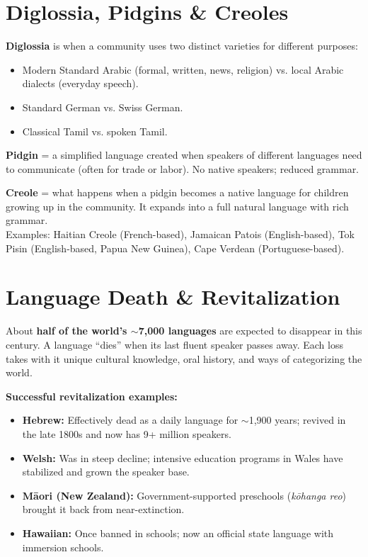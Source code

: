 \documentclass[11pt, letterpaper]{article}
\begin{document}
\section*{Diglossia, Pidgins \& Creoles}

\textbf{Diglossia} is when a community uses two distinct varieties for different purposes:
\begin{itemize}[noitemsep]
  \item Modern Standard Arabic (formal, written, news, religion) vs. local Arabic dialects (everyday speech).
  \item Standard German vs. Swiss German.
  \item Classical Tamil vs. spoken Tamil.
\end{itemize}

\textbf{Pidgin} = a simplified language created when speakers of different languages need to communicate (often for trade or labor). No native speakers; reduced grammar.

\textbf{Creole} = what happens when a pidgin becomes a native language for children growing up in the community. It expands into a full natural language with rich grammar.\\
Examples: Haitian Creole (French-based), Jamaican Patois (English-based), Tok Pisin (English-based, Papua New Guinea), Cape Verdean (Portuguese-based).

\section*{Language Death \& Revitalization}

About \textbf{half of the world's $\sim$7{,}000 languages} are expected to disappear in this century. A language ``dies'' when its last fluent speaker passes away. Each loss takes with it unique cultural knowledge, oral history, and ways of categorizing the world.

\textbf{Successful revitalization examples:}
\begin{itemize}[noitemsep]
  \item \textbf{Hebrew:} Effectively dead as a daily language for $\sim$1{,}900 years; revived in the late 1800s and now has 9+ million speakers.
  \item \textbf{Welsh:} Was in steep decline; intensive education programs in Wales have stabilized and grown the speaker base.
  \item \textbf{M\=aori (New Zealand):} Government-supported preschools (\emph{k\=ohanga reo}) brought it back from near-extinction.
  \item \textbf{Hawaiian:} Once banned in schools; now an official state language with immersion schools.
\end{itemize}
\end{document}
